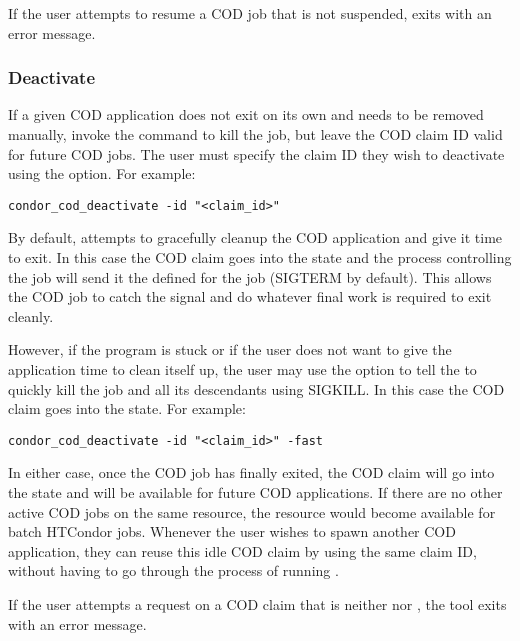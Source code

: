 If the user attempts to resume a COD job that is not suspended,
 exits with an error message.


\subsubsection{\label{sec:cod-claim-deactivate}Deactivate}

If a given COD application does not exit on its own and needs to be
removed manually, invoke the 
command to kill the job, but leave the COD claim ID valid for future
COD jobs.
The user must specify the claim ID they wish to deactivate using the
 option.
For example:
\begin{verbatim}
condor_cod_deactivate -id "<claim_id>"
\end{verbatim}

By default,  attempts to gracefully cleanup
the COD application and give it time to exit.
In this case the COD claim goes into the \verb@Vacating@ state and the
 process controlling the job will send it the 
 defined for the job (SIGTERM by default).
This allows the COD job to catch the signal and do whatever final work
is required to exit cleanly.

However, if the program is stuck or if the user does not want to give
the application time to clean itself up, the user may use the
 option to tell the  to quickly kill the
job and all its descendants using SIGKILL.
In this case the COD claim goes into the \verb@Killing@ state.
For example:
\begin{verbatim}
condor_cod_deactivate -id "<claim_id>" -fast
\end{verbatim}

In either case, once the COD job has finally exited, the COD claim
will go into the \verb@Idle@ state and will be available for future
COD applications.
If there are no other active COD jobs on the same resource, the
resource would become available for batch HTCondor jobs. 
Whenever the user wishes to spawn another COD application, they can
reuse this idle COD claim by using the same claim ID, without having
to go through the process of running .

If the user attempts a  request on a COD claim
that is neither \verb@Running@ nor \verb@Suspended@, the 
tool exits with an error message.


